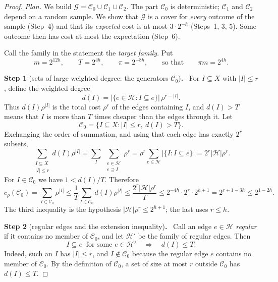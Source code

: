 \documentclass[11pt,letterpaper]{article}
\theoremstyle{definition}
\theoremstyle{remark}
\numberwithin{equation}{section}
\newcommand{\step}[2]{\medskip\noindent\textbf{Step #1} (#2)\textbf{.}\ }
\begin{document}
\begin{proof}
\emph{Plan.} We build $\mathcal G=\mathcal C_0\cup\mathcal C_1\cup\mathcal C_2$.
The part $\mathcal C_0$ is deterministic; $\mathcal C_1$ and $\mathcal C_2$
depend on a random sample. We show that $\mathcal G$ is a cover for
\emph{every} outcome of the sample (Step~4) and that its \emph{expected}
cost is at most $3\cdot2^{-h}$ (Steps~1, 3, 5). Some outcome then has cost
at most the expectation (Step~6).

Call the family in the statement the \emph{target family}. Put
\[
m=2^{12h},\qquad T=2^{4h},\qquad \pi=2^{-8h},
\qquad\text{so that}\qquad \pi m=2^{4h}.
\]

\step{1}{sets of large weighted degree: the generators $\mathcal C_0$}
For \(I\subseteq X\) with \(|I|\le r\), define the weighted degree
\[
d(I)=|\{e\in\mathcal H:I\subseteq e\}|\,\rho^{r-|I|}.
\]
Thus $d(I)\rho^{|I|}$ is the total cost $\rho^r$ of the edges containing
$I$, and $d(I)>T$ means that $I$ is more than $T$ times cheaper than the
edges through it. Let
\[
\mathcal C_0=\{I\subseteq X:|I|\le r,\ d(I)>T\}.
\]
Exchanging the order of summation, and using that each edge has exactly
$2^r$ subsets,
\[
\sum_{\substack{I\subseteq X\\|I|\le r}}d(I)\rho^{|I|}
=\sum_{I}\ \sum_{\substack{e\in\mathcal H\\ e\supseteq I}}\rho^{r}
=\rho^r\sum_{e\in\mathcal H}|\{I:I\subseteq e\}|
=2^r|\mathcal H|\rho^r.
\]
For $I\in\mathcal C_0$ we have $1<d(I)/T$. Therefore
\begin{equation}\label{eq:covering-initial-cost}
c_\rho(\mathcal C_0)=\sum_{I\in\mathcal C_0}\rho^{|I|}
\le\frac1T\sum_{I\in\mathcal C_0}d(I)\rho^{|I|}
\le\frac{2^r|\mathcal H|\rho^r}{T}
\le2^{-4h}\cdot2^r\cdot2^{h+1}=2^{r+1-3h}\le2^{1-2h}.
\end{equation}
The third inequality is the hypothesis $|\mathcal H|\rho^r\le2^{h+1}$;
the last uses $r\le h$.

\step{2}{regular edges and the extension inequality}
Call an edge $e\in\mathcal H$ \emph{regular} if it contains no member of
\(\mathcal C_0\), and let \(\mathcal H'\) be the family of regular edges.
Then
\begin{equation}\label{eq:regular}
I\subseteq e\ \text{ for some }e\in\mathcal H'
\quad\Longrightarrow\quad d(I)\le T.
\end{equation}
Indeed, such an $I$ has $|I|\le r$, and $I\notin\mathcal C_0$ because the
regular edge $e$ contains no member of $\mathcal C_0$. By the definition of
$\mathcal C_0$, a set of size at most $r$ outside $\mathcal C_0$ has
$d(I)\le T$.


\end{proof}
\end{document}
